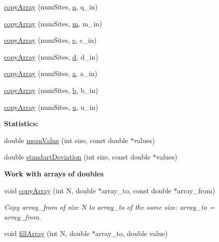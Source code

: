 \begin{DoxyCompactItemize}
\hyperlink{namespace_p_c_a_a9dbd4cd129f013da15375aec85b2f4fe}{copy\+Array} (num\+Sites, \hyperlink{namespace_p_c_a_a5182a7edfe31f7477e5335bc60fcf108}{q}, q\+\_\+in)
\item 
\hyperlink{namespace_p_c_a_aa724072bc973fbc29e1e148eace3272e}{copy\+Array} (num\+Sites, \hyperlink{namespace_p_c_a_acfc8187195fb96910fe83d4ff79b3239}{m}, m\+\_\+in)
\item 
\hyperlink{namespace_p_c_a_a04df9929dc9ef1e5af273b4ca61f93c3}{copy\+Array} (num\+Sites, \hyperlink{namespace_p_c_a_a4e2c91089d5d84755539f212ad87f02a}{c}, c\+\_\+in)
\item 
\hyperlink{namespace_p_c_a_a2b9aa130e94cb88875159aaf23ff8dfb}{copy\+Array} (num\+Sites, \hyperlink{namespace_p_c_a_abf43edb3e63963e603bf8c8ce20abf94}{d}, d\+\_\+in)
\item 
\hyperlink{namespace_p_c_a_a3ab4fdf7f49322cf707b5d1977c87913}{copy\+Array} (num\+Sites, \hyperlink{namespace_p_c_a_a7ba252167ecbbceaa608cd406810aa1f}{a}, a\+\_\+in)
\item 
\hyperlink{namespace_p_c_a_a5a7531f7aeee8b958633285e7ae8ebab}{copy\+Array} (num\+Sites, \hyperlink{namespace_p_c_a_a92ab50a62efb8eaa1bcd8e279828125b}{b}, b\+\_\+in)
\item 
\hyperlink{namespace_p_c_a_a2e31962f6d08fdd98626faf1e2e25094}{copy\+Array} (num\+Sites, \hyperlink{namespace_p_c_a_a4a22821642ff929e86e49ad05b7545ad}{u}, u\+\_\+in)
\end{DoxyCompactItemize}
\begin{Indent}{\bf Statistics\+:}\par
\begin{DoxyCompactItemize}
\item 
double \hyperlink{namespace_p_c_a_a330e0aee67470237e1e755eb5b151d6c}{mean\+Value} (int size, const double $\ast$values)
\item 
double \hyperlink{namespace_p_c_a_ae9120f4f9875a87768cc3090196892a8}{standart\+Deviation} (int size, const double $\ast$values)
\end{DoxyCompactItemize}
\end{Indent}
\begin{Indent}{\bf Work with arrays of doubles}\par
\begin{DoxyCompactItemize}
\item 
void \hyperlink{namespace_p_c_a_ac0ca09771710ce44c06d3f5f4402fd80}{copy\+Array} (int N, double $\ast$array\+\_\+to, const double $\ast$array\+\_\+from)
\begin{DoxyCompactList}\small\item\em Copy array\+\_\+from of size N to array\+\_\+to of the same size\+: array\+\_\+to = array\+\_\+from. \end{DoxyCompactList}\item 
void \hyperlink{namespace_p_c_a_af4a7844595578d2c8e09635fba6db3b2}{fill\+Array} (int N, double $\ast$array\+\_\+to, double value)
\end{DoxyCompactItemize}
\end{Indent}
